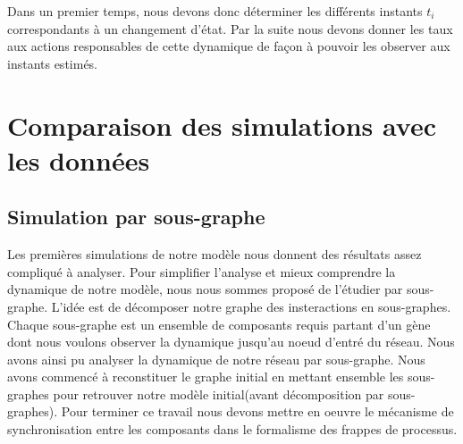Dans un premier temps, nous devons donc déterminer les différents instants $t_{i}$ correspondants à un changement d'état. Par la suite nous devons 
donner les taux aux actions responsables de cette dynamique de façon à pouvoir les observer aux instants estimés.






\section{Comparaison des simulations avec les données}

\subsection{Simulation par sous-graphe}

Les premières simulations de notre modèle nous donnent des résultats assez compliqué à analyser. Pour simplifier l'analyse et mieux comprendre
la dynamique de notre modèle, nous nous sommes proposé de l'étudier par sous-graphe. L'idée est de décomposer notre graphe des insteractions en sous-graphes. 
Chaque sous-graphe est un ensemble de composants requis partant d'un gène dont nous voulons observer la dynamique  jusqu'au noeud d'entré du réseau. Nous avons 
ainsi pu analyser  la dynamique de notre réseau par sous-graphe. Nous avons commencé à reconstituer le graphe initial en mettant ensemble les sous-graphes pour
retrouver notre modèle initial(avant décomposition par sous-graphes). Pour terminer 
ce travail nous devons mettre en oeuvre le mécanisme de synchronisation entre les composants dans le formalisme des frappes de processus.


